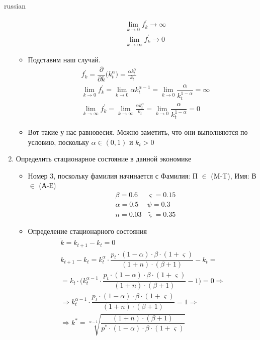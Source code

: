 \documentclass[fleqn]{article}
\begin{document}
\begin{otherlanguage*}{russian}
\begin{enumerate}[label=\alph*), leftmargin=*]
\begin{itemize}
\begin{align*}
&\lim_{k \rightarrow 0 } f^{'}_k \rightarrow \infty \\
&\lim_{k \rightarrow \infty} f^{'}_k \rightarrow 0 
\end{align*}
\item Подставим наш случай. 
\begin{align*}
&f^{'}_k = \dfrac{\partial }{\partial k} \Big( k^{\alpha}_t \Big) = \frac{\alpha k_{t}^{\alpha}}{k_{t}}
\\
&\lim_{k \rightarrow 0} f^{'}_k = \lim_{k \rightarrow 0} \alpha k_{t}^{\alpha - 1} = \lim_{k \rightarrow 0} \dfrac{\alpha}{k_t^{1-\alpha}} = \infty
\\ 
&\lim_{k \rightarrow \infty} f^{'}_k =\lim_{k \rightarrow \infty} \frac{\alpha k_{t}^{\alpha}}{k_{t}} =  \lim_{k \rightarrow 0} \dfrac{\alpha}{k_t^{1-\alpha}} = 0
\end{align*}
\item Вот такие у нас равновесия. Можно заметить, что они выполняются по условию, поскольку $ \alpha \in (0, 1) $ и $ k_t > 0 $ 
\end{itemize}
\item Определить стационарное состояние в данной экономике 
\begin{itemize}
\item Номер 3, поскольку фамилия начинается с Фамилия: П $ \in $ (M-T), Имя: В $ \in $ (А-Е) 
\begin{align*}
&\beta = 0.6 
&\varsigma = 0.15 \\ 
&\alpha = 0.5  
&\psi = 0.3 \\ 
&n = 0.03 
& \tilde{\varsigma}  = 0.35 
\end{align*}
\item Определение стационарного состояния 
\begin{align*}
\dot k = k_{t+1} - k_t = 0 \\
k_{t+1} - k_t =k^{\alpha}_t \cdot \dfrac{p_t \cdot (1 - \alpha) \cdot \beta \cdot (1 + \varsigma)}{(1 + n) \cdot (\beta + 1) } - k_t = 
\\
= k_t \cdot \Big( k^{\alpha - 1}_t \cdot \dfrac{p_t \cdot (1 - \alpha) \cdot \beta \cdot (1 + \varsigma)}{(1 + n) \cdot (\beta + 1) } - 1 \Big) = 0 \Rightarrow \\
\Rightarrow k^{\alpha - 1}_t \cdot \dfrac{p_t \cdot (1 - \alpha) \cdot \beta \cdot (1 + \varsigma)}{(1 + n) \cdot (\beta + 1) } = 1 \Rightarrow \\
\Rightarrow k^* = \sqrt[\alpha - 1]{
\dfrac{(1 + n) \cdot ( \beta + 1) }{p^* \cdot (1 - \alpha) \cdot \beta \cdot (1 + \varsigma )}
}
\end{align*}
\end{itemize}
\end{enumerate}
\end{otherlanguage*}
\end{document}
